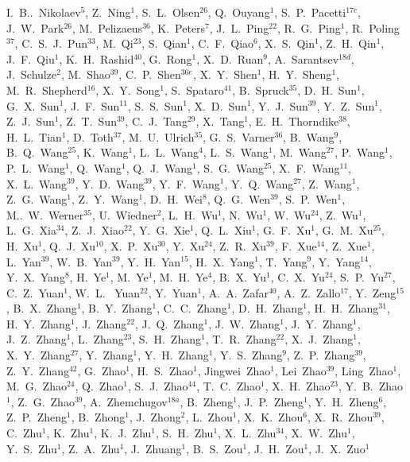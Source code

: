 \begin{frontmatter}
{\begin{small}
I.~B..~Nikolaev$^{5}$, Z.~Ning$^{1}$, S.~L.~Olsen$^{26}$, Q.~Ouyang$^{1}$, S.~P.~Pacetti$^{17c}$, J.~W.~Park$^{26}$, M.~Pelizaeus$^{36}$, K.~Peters$^{7}$, J.~L.~Ping$^{22}$, R.~G.~Ping$^{1}$, R.~Poling$^{37}$, C.~S.~J.~Pun$^{33}$, M.~Qi$^{23}$, S.~Qian$^{1}$, C.~F.~Qiao$^{6}$, X.~S.~Qin$^{1}$, Z.~H.~Qin$^{1}$, J.~F.~Qiu$^{1}$, K.~H.~Rashid$^{40}$, G.~Rong$^{1}$, X.~D.~Ruan$^{9}$, A.~Sarantsev$^{18d}$, J.~Schulze$^{2}$, M.~Shao$^{39}$, C.~P.~Shen$^{36e}$, X.~Y.~Shen$^{1}$, H.~Y.~Sheng$^{1}$, M.~R.~Shepherd$^{16}$, X.~Y.~Song$^{1}$, S.~Spataro$^{41}$, B.~Spruck$^{35}$, D.~H.~Sun$^{1}$, G.~X.~Sun$^{1}$, J.~F.~Sun$^{11}$, S.~S.~Sun$^{1}$, X.~D.~Sun$^{1}$, Y.~J.~Sun$^{39}$, Y.~Z.~Sun$^{1}$, Z.~J.~Sun$^{1}$, Z.~T.~Sun$^{39}$, C.~J.~Tang$^{29}$, X.~Tang$^{1}$, E.~H.~Thorndike$^{38}$, H.~L.~Tian$^{1}$, D.~Toth$^{37}$, M.~U.~Ulrich$^{35}$, G.~S.~Varner$^{36}$, B.~Wang$^{9}$, B.~Q.~Wang$^{25}$, K.~Wang$^{1}$, L.~L.~Wang$^{4}$, L.~S.~Wang$^{1}$, M.~Wang$^{27}$, P.~Wang$^{1}$, P.~L.~Wang$^{1}$, Q.~Wang$^{1}$, Q.~J.~Wang$^{1}$, S.~G.~Wang$^{25}$, X.~F.~Wang$^{11}$, X.~L.~Wang$^{39}$, Y.~D.~Wang$^{39}$, Y.~F.~Wang$^{1}$, Y.~Q.~Wang$^{27}$, Z.~Wang$^{1}$, Z.~G.~Wang$^{1}$, Z.~Y.~Wang$^{1}$, D.~H.~Wei$^{8}$, Q.~G.~Wen$^{39}$, S.~P.~Wen$^{1}$, M..~W.~Werner$^{35}$,
U.~Wiedner$^{2}$, L.~H.~Wu$^{1}$, N.~Wu$^{1}$, W.~Wu$^{24}$, Z.~Wu$^{1}$, L.~G.~Xia$^{34}$, Z.~J.~Xiao$^{22}$, Y.~G.~Xie$^{1}$, Q.~L.~Xiu$^{1}$, G.~F.~Xu$^{1}$, G.~M.~Xu$^{25}$, H.~Xu$^{1}$, Q.~J.~Xu$^{10}$, X.~P.~Xu$^{30}$, Y.~Xu$^{24}$, Z.~R.~Xu$^{39}$, F.~Xue$^{14}$, Z.~Xue$^{1}$, L.~Yan$^{39}$, W.~B.~Yan$^{39}$, Y.~H.~Yan$^{15}$, H.~X.~Yang$^{1}$, T.~Yang$^{9}$, Y.~Yang$^{14}$, Y.~X.~Yang$^{8}$, H.~Ye$^{1}$, M.~Ye$^{1}$, M.~H.~Ye$^{4}$, B.~X.~Yu$^{1}$, C.~X.~Yu$^{24}$, S.~P.~Yu$^{27}$, C.~Z.~Yuan$^{1}$, W.~L. ~Yuan$^{22}$, Y.~Yuan$^{1}$, A.~A.~Zafar$^{40}$, A.~Z.~Zallo$^{17}$, Y.~Zeng$^{15}$, B.~X.~Zhang$^{1}$, B.~Y.~Zhang$^{1}$, C.~C.~Zhang$^{1}$, D.~H.~Zhang$^{1}$, H.~H.~Zhang$^{31}$, H.~Y.~Zhang$^{1}$, J.~Zhang$^{22}$, J.~Q.~Zhang$^{1}$, J.~W.~Zhang$^{1}$, J.~Y.~Zhang$^{1}$, J.~Z.~Zhang$^{1}$, L.~Zhang$^{23}$, S.~H.~Zhang$^{1}$, T.~R.~Zhang$^{22}$, X.~J.~Zhang$^{1}$, X.~Y.~Zhang$^{27}$, Y.~Zhang$^{1}$, Y.~H.~Zhang$^{1}$, Y.~S.~Zhang$^{9}$, Z.~P.~Zhang$^{39}$, Z.~Y.~Zhang$^{42}$, G.~Zhao$^{1}$, H.~S.~Zhao$^{1}$, Jingwei~Zhao$^{1}$, Lei~Zhao$^{39}$, Ling~Zhao$^{1}$, M.~G.~Zhao$^{24}$, Q.~Zhao$^{1}$, S.~J.~Zhao$^{44}$, T.~C.~Zhao$^{1}$, X.~H.~Zhao$^{23}$, Y.~B.~Zhao$^{1}$, Z.~G.~Zhao$^{39}$, A.~Zhemchugov$^{18a}$, B.~Zheng$^{1}$, J.~P.~Zheng$^{1}$, Y.~H.~Zheng$^{6}$, Z.~P.~Zheng$^{1}$, B.~Zhong$^{1}$, J.~Zhong$^{2}$, L.~Zhou$^{1}$, X.~K.~Zhou$^{6}$, X.~R.~Zhou$^{39}$, C.~Zhu$^{1}$, K.~Zhu$^{1}$, K.~J.~Zhu$^{1}$, S.~H.~Zhu$^{1}$, X.~L.~Zhu$^{34}$, X.~W.~Zhu$^{1}$, Y.~S.~Zhu$^{1}$, Z.~A.~Zhu$^{1}$, J.~Zhuang$^{1}$, B.~S.~Zou$^{1}$, J.~H.~Zou$^{1}$, J.~X.~Zuo$^{1}$

\end{small}}
\end{frontmatter}
